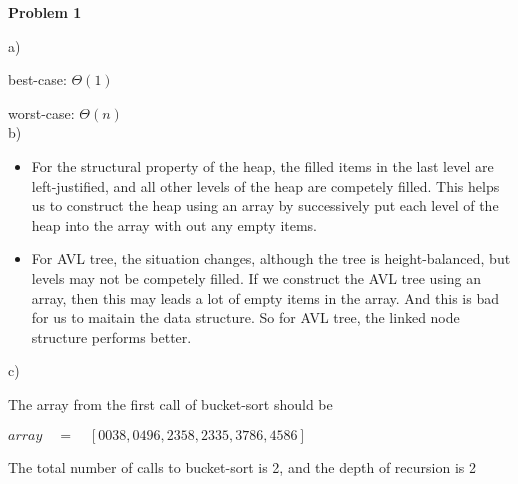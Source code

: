 \documentclass[12pt]{article}
\begin{document}
	
	\begin{center}
		{\Large\bf Problem 1}\\
		\vspace{3mm}
	\end{center}
	
	\def\question#1{\item[\bf #1.]}
	\def\part#1{\item[\bf #1)]}
	\newcommand{\pc}[1]{\mbox{\textbf{#1}}} %
	
	
	
	
	a)
	
	best-case: $\Theta(1)$
	
	worst-case: $\Theta(n)$\\
	
	b)
	\begin{itemize}
		\item For the structural property of the heap, the filled items in the last level are left-justified, and all other levels of the heap are competely filled. This helps us to construct the heap using an array by successively put each level of the heap into the array with out any empty items.
		\item For AVL tree, the situation changes, although the tree is height-balanced, but levels may not be competely filled. If we construct the AVL tree using an array, then this may leads a lot of empty items in the array. And this is bad for us to maitain the data structure. So for AVL tree, the linked node structure performs better.
	\end{itemize}

	c)
	
	The array from the first call of bucket-sort should be
	
	$array\quad = \quad [0038,0496,2358,2335,3786,4586]$
	
	The total number of calls to bucket-sort is 2, and the depth of recursion is 2
	
\end{document}
